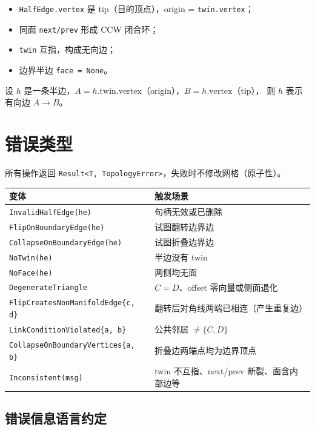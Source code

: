 \documentclass[11pt,a4paper]{article}
\begin{document}
\begin{itemize}
  \item \texttt{HalfEdge.vertex} 是 tip（目的顶点），origin = \texttt{twin.vertex}；
  \item 同面 \texttt{next/prev} 形成 CCW 闭合环；
  \item \texttt{twin} 互指，构成无向边；
  \item 边界半边 \texttt{face = None}。
\end{itemize}

设 $h$ 是一条半边，$A = h.\mathrm{twin}.\mathrm{vertex}$（origin），$B = h.\mathrm{vertex}$（tip），
则 $h$ 表示有向边 $A \to B$。

\section{错误类型}

所有操作返回 \texttt{Result<T, TopologyError>}，失败时不修改网格（原子性）。

\begin{center}
\renewcommand{\arraystretch}{1.18}
\begin{tabular}{@{}ll@{}}
  \toprule
  \textbf{变体} & \textbf{触发场景} \\
  \midrule
  \texttt{InvalidHalfEdge(he)}       & 句柄无效或已删除 \\
  \texttt{FlipOnBoundaryEdge(he)}    & 试图翻转边界边 \\
  \texttt{CollapseOnBoundaryEdge(he)} & 试图折叠边界边 \\
  \texttt{NoTwin(he)}                & 半边没有 twin \\
  \texttt{NoFace(he)}                & 两侧均无面 \\
  \texttt{DegenerateTriangle}        & $C = D$、offset 零向量或侧面退化 \\
  \texttt{FlipCreatesNonManifoldEdge\{c, d\}} & 翻转后对角线两端已相连（产生重复边）\\
  \texttt{LinkConditionViolated\{a, b\}} & 公共邻居 $\neq \{C, D\}$ \\
  \texttt{CollapseOnBoundaryVertices\{a, b\}} & 折叠边两端点均为边界顶点 \\
  \texttt{Inconsistent(msg)}         & twin 不互指、next/prev 断裂、面含内部边等 \\
  \bottomrule
\end{tabular}
\end{center}

\subsection{错误信息语言约定}
\end{document}
